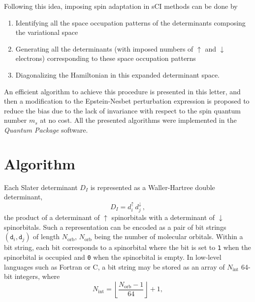 \documentclass[aip,jcp,reprint,showkeys]{revtex4-1}
\newcommand{\md}{\mathtt{d}}
\newcommand{\up}{\uparrow}
\newcommand{\dn}{\downarrow}
\newcommand{\Nint}{{N_\text{int}}}
\newcommand{\Norb}{{N_\text{orb}}}
\newcommand{\one}{{\texttt{1}}}
\newcommand{\zero}{{\texttt{0}}}
\newcommand{\sci}{sCI}
\begin{document}
Following this idea, imposing spin adaptation in \sci{} methods can be done by 
\begin{enumerate}
\item Identifying all the space occupation patterns of the determinants composing
      the variational space
\item Generating all the determinants (with imposed numbers of $\up$ and
      $\dn$ electrons) corresponding to these space occupation patterns
\item Diagonalizing the Hamiltonian in this expanded determinant space.
\end{enumerate}
An efficient algorithm to achieve this procedure is presented in this letter,
and then a modification to the Epstein-Nesbet perturbation expression is
proposed to reduce the bias due to the lack of invariance with respect to 
the spin quantum number $m_s$ at no cost.
All the presented algorithms were implemented in the \emph{Quantum Package}
software.\cite{qp}

                                    



\section{Algorithm}

Each Slater determinant $D_I$ is represented as a Waller-Hartree double
determinant,\cite{Pauncz_1989}
\begin{equation}
 \label{eq:di}
 D_I = d_i^\up \, d_j^\dn\, ,
\end{equation}
the product of a determinant of
$\up$ spinorbitals with a determinant of $\dn$ spinorbitals.
Such a representation can be encoded as a pair of bit strings $(\md_i,\md_j)$ of length $\Norb$,  $\Norb$ being the number of molecular orbitals.
Within a bit string, each bit corresponds to a spinorbital where the bit is set to \one{} when the
spinorbital is occupied and \zero{} when the spinorbital is empty. In low-level languages such as Fortran or C, a bit
string may be stored as an array of $\Nint$ 64-bit integers, where 
\begin{equation}
  \Nint = \left \lfloor \frac{\Norb-1}{64} \right \rfloor + 1,
\end{equation}
\end{document}
